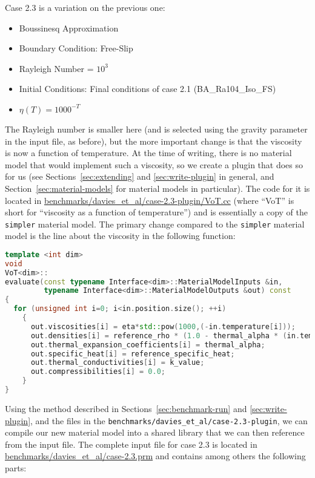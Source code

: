 \documentclass{article}
\begin{document}
Case 2.3 is a variation on the previous one:
\begin{itemize}
\item Boussinesq Approximation
\item Boundary Condition: Free-Slip
\item Rayleigh Number = $10^3$ 
\item Initial Conditions: Final conditions of case 2.1 (BA\_Ra104\_Iso\_FS)
\item $\eta(T) = 1000^{-T}$
\end{itemize}
The Rayleigh number is smaller here (and is selected using the gravity
parameter in the input file, as before), but the more important change is that the
viscosity is now a function of temperature. At the time of writing, there is
no material model that would implement such a viscosity, so we
create a plugin that does so for us (see Sections~\ref{sec:extending} and
\ref{sec:write-plugin} in
general, and Section~\ref{sec:material-models} for material models in
particular). The code for it is located in 
\url{benchmarks/davies_et_al/case-2.3-plugin/VoT.cc} (where ``VoT'' is short
for ``viscosity as a function of temperature'') and is essentially a copy of
the \texttt{simpler} material model. The primary change compared to the 
\texttt{simpler} material model is the line about the viscosity in the
following function:
\begin{lstlisting}[frame=single,language=C++]
template <int dim>
void
VoT<dim>::
evaluate(const typename Interface<dim>::MaterialModelInputs &in,
         typename Interface<dim>::MaterialModelOutputs &out) const
{
  for (unsigned int i=0; i<in.position.size(); ++i)
    {
      out.viscosities[i] = eta*std::pow(1000,(-in.temperature[i]));
      out.densities[i] = reference_rho * (1.0 - thermal_alpha * (in.temperature[i] - reference_T));
      out.thermal_expansion_coefficients[i] = thermal_alpha;
      out.specific_heat[i] = reference_specific_heat;
      out.thermal_conductivities[i] = k_value;
      out.compressibilities[i] = 0.0;
    }
}
\end{lstlisting}
Using the method described in Sections~\ref{sec:benchmark-run} and
\ref{sec:write-plugin}, and the files in 
the \texttt{benchmarks/davies\_et\_al/case-2.3-plugin}, we can compile our new
material model into a shared library that we can then reference from the input file.
The complete input file for case 2.3 is located in
\url{benchmarks/davies_et_al/case-2.3.prm} and contains among others the
following parts:


\end{document}
